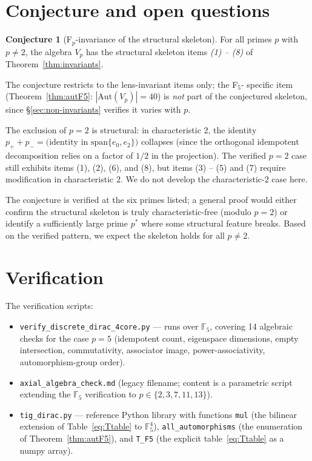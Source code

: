 \documentclass[11pt,reqno]{amsart}
\theoremstyle{plain}
\theoremstyle{definition}
\newtheorem{conjecture}[theorem]{Conjecture}
\theoremstyle{remark}
\newcommand{\F}{\mathbb{F}}
\newcommand{\Aut}{\mathrm{Aut}}
\begin{document}
\section{Conjecture and open questions}

\begin{conjecture}[F$_p$-invariance of the structural skeleton]
\label{conj:fpskel}
For all primes $p$ with $p \neq 2$, the algebra $V_p$ has the
structural skeleton items \emph{(1) -- (8)} of
Theorem~\ref{thm:invariants}.
\end{conjecture}

The conjecture restricts to the lens-invariant items only; the F$_5$-
specific item (Theorem~\ref{thm:autF5}: $|\Aut(V_p)| = 40$) is
\emph{not} part of the conjectured skeleton, since
§\ref{sec:non-invariants} verifies it varies with $p$.

The exclusion of $p = 2$ is structural: in characteristic $2$, the
identity $p_+ + p_- = \text{(identity in } \mathrm{span}\{e_0, e_2\}\text{)}$
collapses (since the orthogonal idempotent decomposition relies on a
factor of $1/2$ in the projection). The verified $p = 2$ case still
exhibits items (1), (2), (6), and (8), but items (3) -- (5) and (7)
require modification in characteristic $2$. We do not develop the
characteristic-$2$ case here.

The conjecture is verified at the six primes listed; a general proof
would either confirm the structural skeleton is truly
characteristic-free (modulo $p = 2$) or identify a sufficiently large
prime $p^*$ where some structural feature breaks. Based on the
verified pattern, we expect the skeleton holds for all $p \neq 2$.

\section{Verification}
\label{sec:verify}

The verification scripts:
\begin{itemize}[leftmargin=2em]
\item \texttt{verify\_discrete\_dirac\_4core.py} — runs over $\F_5$,
covering 14 algebraic checks for the case $p = 5$ (idempotent count,
eigenspace dimensions, empty intersection, commutativity, associator
image, power-associativity, automorphism-group order).
\item \texttt{axial\_algebra\_check.md} (legacy filename;
content is a parametric script extending the $\F_5$ verification
to $p \in \{2, 3, 7, 11, 13\}$).
\item \texttt{tig\_dirac.py} — reference Python library with
functions \texttt{mul} (the bilinear extension of
Table~\eqref{eq:Ttable} to $\F_5^4$), \texttt{all\_automorphisms} (the
enumeration of Theorem~\ref{thm:autF5}), and \texttt{T\_F5} (the
explicit table~\eqref{eq:Ttable} as a numpy array).
\end{itemize}
\end{document}
